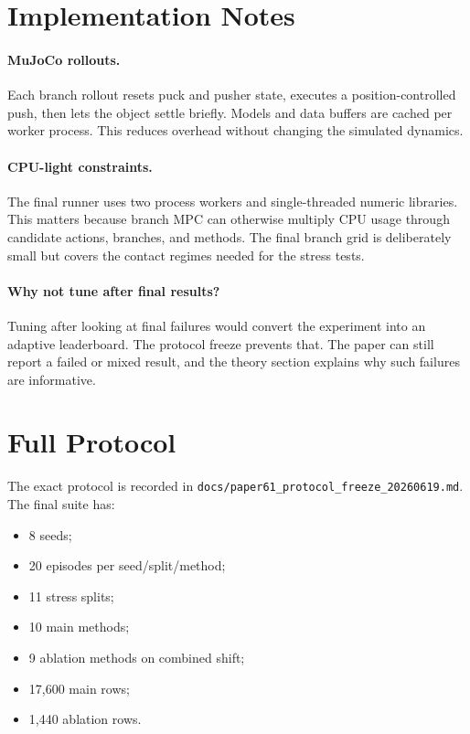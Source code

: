 \documentclass{article}
\begin{document}
\section{Implementation Notes}

\paragraph{MuJoCo rollouts.}
Each branch rollout resets puck and pusher state, executes a position-controlled push, then lets the object settle briefly.  Models and data buffers are cached per worker process.  This reduces overhead without changing the simulated dynamics.

\paragraph{CPU-light constraints.}
The final runner uses two process workers and single-threaded numeric libraries.  This matters because branch MPC can otherwise multiply CPU usage through candidate actions, branches, and methods.  The final branch grid is deliberately small but covers the contact regimes needed for the stress tests.

\paragraph{Why not tune after final results?}
Tuning after looking at final failures would convert the experiment into an adaptive leaderboard.  The protocol freeze prevents that.  The paper can still report a failed or mixed result, and the theory section explains why such failures are informative.

\section{Full Protocol}

The exact protocol is recorded in \texttt{docs/paper61\_protocol\_freeze\_20260619.md}.  The final suite has:
\begin{itemize}[leftmargin=1.4em]
  \item 8 seeds;
  \item 20 episodes per seed/split/method;
  \item 11 stress splits;
  \item 10 main methods;
  \item 9 ablation methods on combined shift;
  \item 17,600 main rows;
  \item 1,440 ablation rows.
\end{itemize}
\end{document}

